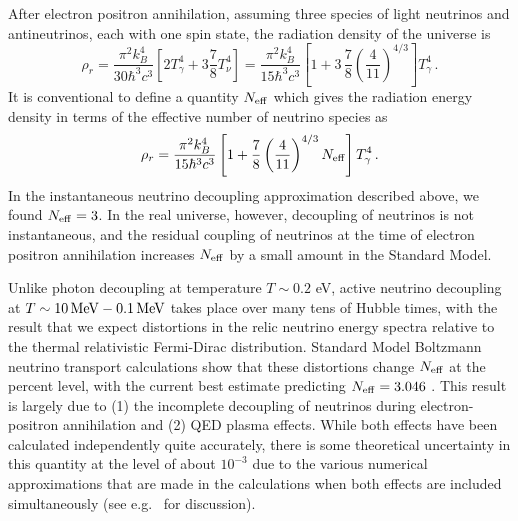After electron positron annihilation, assuming three species of light neutrinos and antineutrinos, each with one spin state, the radiation density of the universe is
\begin{equation}
	\rho_r = \frac{\pi^2k_B^4}{30\hbar^3 c^3}\left[2T_\gamma^4 + 3\frac{7}{8}T_\nu^4\right] = \frac{\pi^2k_B^4}{15\hbar^3 c^3}\left[1+3\,\frac{7}{8}\left(\frac{4}{11}\right)^{4/3}\right] T_\gamma^4 \, .
\end{equation}
It is conventional to define a quantity $N_{\rm eff}$ which gives the radiation energy density in terms of the effective number of neutrino species as
\begin{equation}\label{eq:rho_r_Neff}
	\rho_r = \frac{\pi^2k_B^4}{15\hbar^3 c^3}\left[1+\frac{7}{8}\left(\frac{4}{11}\right)^{4/3}N_{\rm eff}\right] T_\gamma^4 \, .
\end{equation}
In the instantaneous neutrino decoupling approximation described above, we found $N_{\rm eff} = 3$.  In the real universe, however, decoupling of neutrinos is not instantaneous, and the residual coupling of neutrinos at the time of electron positron annihilation increases $N_{\rm eff}$ by a small amount in the Standard Model.

Unlike photon decoupling at temperature $T \sim 0.2$ eV, active neutrino decoupling at $T \sim 10 \, {\rm MeV} - 0.1 \, {\rm MeV}$ takes place over many tens of Hubble times, with the result that we expect distortions in the relic neutrino energy spectra relative to the thermal relativistic Fermi-Dirac distribution. Standard Model Boltzmann neutrino transport calculations show that these distortions change $N_{\rm eff}$ at the percent level, with the current best estimate predicting $N_{\rm eff} = 3.046$ \cite{Mangano:2005cc}.   This result is largely due to (1) the incomplete decoupling of neutrinos during electron-positron annihilation and (2) QED plasma effects.  While both effects have been calculated independently quite accurately, there is some theoretical uncertainty in this quantity at the level of about $10^{-3}$ due to the various numerical approximations that are made in the calculations when both effects are included simultaneously (see e.g.~\cite{Grohs:2015tfy} for discussion).  




